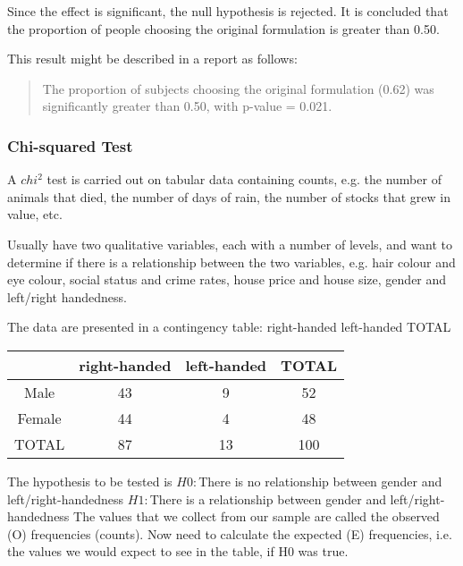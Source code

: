 Since the effect is significant, the null hypothesis is rejected. It is concluded that the proportion of people choosing the original formulation is greater than 0.50. 

This result might be described in a report as follows: 

\begin{quote}
	The proportion of subjects choosing the original formulation (0.62) was significantly greater than 0.50, with p-value = 0.021.
\end{quote}  


\subsubsection{Chi-squared Test}

A $chi^2$ test is carried out on tabular data containing counts, e.g. the
number of animals that died, the number of days of rain, the
number of stocks that grew in value, etc.

Usually have two qualitative variables, each with a number of
levels, and want to determine if there is a relationship between the
two variables, e.g. hair colour and eye colour, social status and
crime rates, house price and house size, gender and left/right
handedness.

The data are presented in a contingency table:
right-handed left-handed TOTAL

\begin{tabular}{|c|c|c|c|}
	\hline
	& right-handed &left-handed & TOTAL\\\hline
	Male & 43 & 9 & 52 \\
	Female & 44 & 4 & 48 \\
	TOTAL & 87 & 13 & 100 \\
	\hline
\end{tabular}


The hypothesis to be tested is
$H0 :$There is no relationship between gender and left/right-handedness
$H1 :$There is a relationship between gender and left/right-handedness
The values that we collect from our sample are called the observed
(O) frequencies (counts). Now need to calculate the expected (E)
frequencies, i.e. the values we would expect to see in the table, if
H0 was true.







